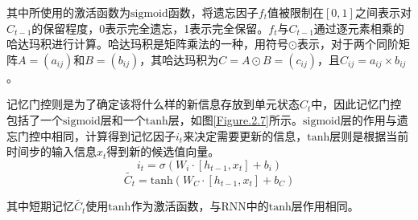 \documentclass[master]{thesis-uestc}
\begin{document}
其中所使用的激活函数为$\mathrm{sigmoid}$函数，将遗忘因子$f_t$值被限制在$[0,1]$之间表示对$C_{t-1}$的保留程度，0表示完全遗忘，1表示完全保留。$f_t$与$C_{t-1}$通过逐元素相乘的哈达玛积进行计算。哈达玛积是矩阵乘法的一种，用符号$\odot$表示，对于两个同阶矩阵$A=(a_{ij})$和$B=(b_{ij})$，其哈达玛积为$C=A\odot B=(c_{ij})$，且$C_{ij}=a_{ij}\times b_{ij}$。

记忆门控则是为了确定该将什么样的新信息存放到单元状态$C_t$中，因此记忆门控包括了一个$\mathrm{sigmoid}$层和一个$\mathrm{tanh}$层，如图\ref{Figure.2.7}所示。$\mathrm{sigmoid}$层的作用与遗忘门控中相同，计算得到记忆因子$i_t$来决定需要更新的信息，$\mathrm{tanh}$层则是根据当前时间步的输入信息$x_t$得到新的候选值向量。
\begin{equation}
   i_{t} = \sigma(W_i\cdot[h_{t-1},x_{t}]+b_i)
\end{equation}
\begin{equation}
   \tilde{C_{t}} = \mathrm{tanh}(W_C\cdot[h_{t-1},x_{t}]+b_C)
\end{equation}

其中短期记忆$\tilde{C_{t}}$使用$\mathrm{tanh}$作为激活函数，与RNN中的$\mathrm{tanh}$层作用相同。
\end{document}
